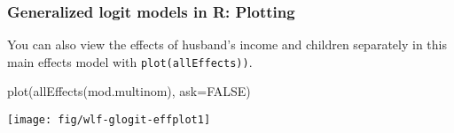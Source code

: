 \begin{frame}[fragile]
  \frametitle{Generalized logit models in R: Plotting}
  \begin{itemize*}
  	\item You can also view the effects of husband's
  	income and children separately in this main effects model with \texttt{plot(allEffects))}.
  \end{itemize*}
\begin{Rin}
plot(allEffects(mod.multinom), ask=FALSE)
\end{Rin}
\begin{center}
	\texttt{[image: fig/wlf-glogit-effplot1]}
\end{center}
\end{frame}
